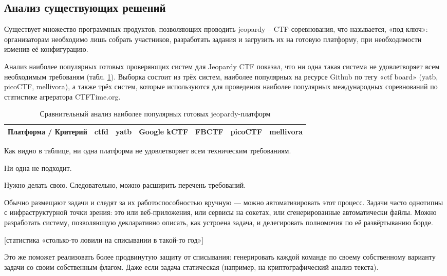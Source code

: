 \subsection{Анализ существующих решений}

Существует множество программных продуктов, позволяющих проводить jeopardy -- CTF-соревнования, что называется, «под ключ»: организаторам необходимо лишь собрать участников, разработать задания и загрузить их на готовую платформу, при необходимости изменив её конфигурацию.

Анализ наиболее популярных готовых проверяющих систем для Jeopardy CTF показал, что ни одна такая система не удовлетворяет всем необходимым требованям (табл. \ref{tab:boards}). Выборка состоит из трёх систем, наиболее популярных на ресурсе Github\cite{GithubCTFTag} по тегу «ctf board» (yatb, picoCTF, mellivora), а также трёх систем, которые используются для проведения наиболее популярных международных соревнований по статистике агрератора CTFTime.org\cite{CTFTime}.

\begin{center}
  \begin{longtable}{|p{}|c|c|c|c|c|c|}
    \caption{Сравнительный анализ наиболее популярных готовых jeopardy-платформ}
    \label{tab:boards}
    Платформа / Критерий & ctfd & yatb & Google kCTF & FBCTF & picoCTF & mellivora \\
    \hline \endhead
    \hline
  \end{longtable}
\end{center}

Как видно в таблице, ни одна платформа не удовлетворяет всем техническим требованиям.

Ни одна не подходит.

Нужно делать свою. Следовательно, можно расширить перечень требований.

Обычно размещают задачи и следят за их работоспособностью вручную — можно автоматизировать этот процесс. Задачи часто однотипны с инфраструктурной точки зрения: это или веб-приложения, или сервисы на сокетах, или сгенерированные автоматически файлы. Можно разработать систему, позволяющую декларативно описать, как устроена задача, и делегировать полномочия по её развёртыванию борде.

[статистика «столько-то ловили на списывании в такой-то год»]

Это же поможет реализовать более продвинутую защиту от списывания: генерировать каждой команде по своему собственному варианту задачи со своим собственным флагом. Даже если задача статическая (например, на криптографический анализ текста).

